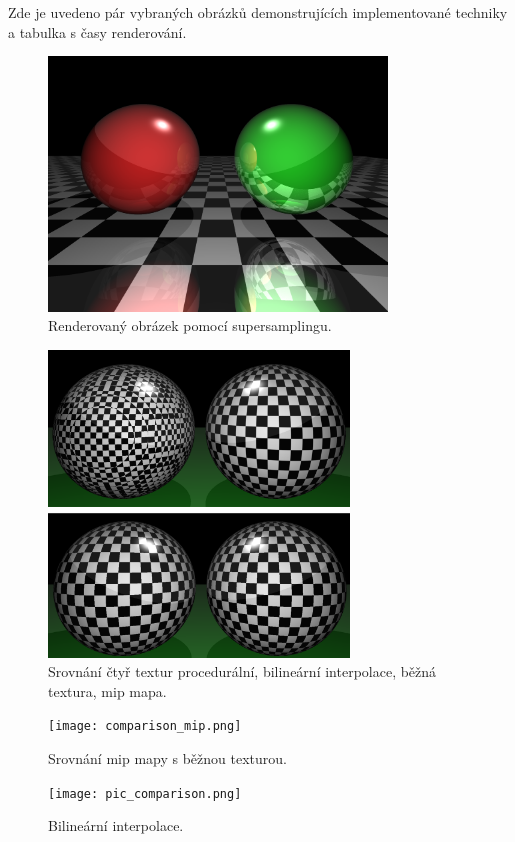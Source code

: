 \documentclass[a4paper, 12pt]{article}
\begin{document}
Zde je uvedeno pár vybraných obrázků demonstrujících implementované techniky a tabulka s časy renderování.
\begin{figure}[H]
  \centering
  \includegraphics[width=9cm,keepaspectratio]{nice.png}
  \caption{Renderovaný obrázek pomocí supersamplingu.}
  \label{fig:nice}
\end{figure}

\begin{figure}[H]
  \centering
  \includegraphics[width=8cm,keepaspectratio]{comparison4.png}
  \caption{Srovnání čtyř textur procedurální, bilineární interpolace, běžná textura, mip mapa.}
  \label{fig:comp}
\end{figure}

\begin{figure}[H]
  \centering
  \texttt{[image: comparison\_mip.png]}
  \caption{Srovnání mip mapy s běžnou texturou.}
  \label{fig:comp1}
\end{figure}

\begin{figure}[H]
  \centering
  \texttt{[image: pic\_comparison.png]}
  \caption{Bilineární interpolace.}
  \label{fig:comp2}
\end{figure}
\end{document}

